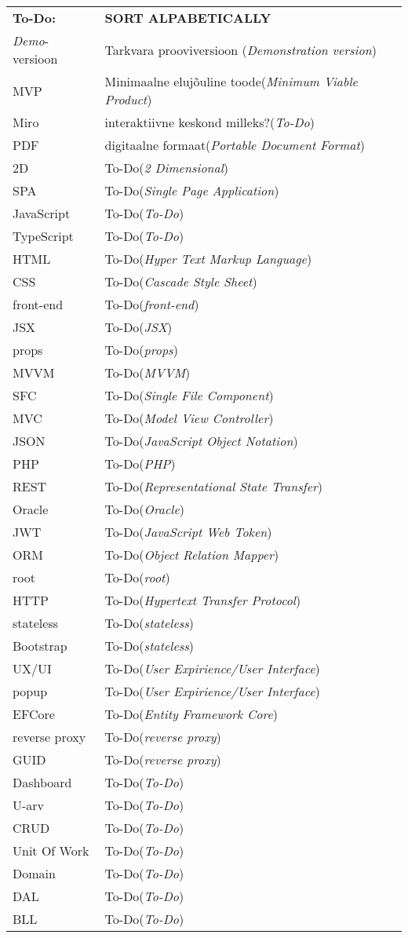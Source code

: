 \begin{longtable}{p{3cm}p{10cm}}
\textbf{To-Do:}&\textbf{SORT ALPABETICALLY}\\
\textit{Demo}-versioon&Tarkvara prooviversioon (\emph{Demonstration version})\\
MVP&Minimaalne elujõuline toode(\emph{Minimum Viable Product})\\
Miro&interaktiivne keskond milleks?(\emph{To-Do})\\
PDF&digitaalne formaat(\emph{Portable Document Format})\\
2D&To-Do(\emph{2 Dimensional})\\
SPA&To-Do(\emph{Single Page Application})\\
JavaScript&To-Do(\emph{To-Do})\\
TypeScript&To-Do(\emph{To-Do})\\
HTML&To-Do(\emph{Hyper Text Markup Language})\\
CSS&To-Do(\emph{Cascade Style Sheet})\\
front-end&To-Do(\emph{front-end})\\
JSX&To-Do(\emph{JSX})\\
props&To-Do(\emph{props})\\
MVVM&To-Do(\emph{MVVM})\\
SFC&To-Do(\emph{Single File Component})\\
MVC&To-Do(\emph{Model View Controller})\\
JSON&To-Do(\emph{JavaScript Object Notation})\\
PHP&To-Do(\emph{PHP})\\
REST&To-Do(\emph{Representational State Transfer})\\
Oracle&To-Do(\emph{Oracle})\\
JWT&To-Do(\emph{JavaScript Web Token})\\
ORM&To-Do(\emph{Object Relation Mapper})\\
root&To-Do(\emph{root})\\
HTTP&To-Do(\emph{Hypertext Transfer Protocol})\\
stateless&To-Do(\emph{stateless})\\
Bootstrap&To-Do(\emph{stateless})\\
UX/UI&To-Do(\emph{User Expirience/User Interface})\\
popup&To-Do(\emph{User Expirience/User Interface})\\
EFCore&To-Do(\emph{Entity Framework Core})\\
reverse proxy&To-Do(\emph{reverse proxy})\\
GUID&To-Do(\emph{reverse proxy})\\
Dashboard&To-Do(\emph{To-Do})\\
U-arv&To-Do(\emph{To-Do})\\
CRUD&To-Do(\emph{To-Do})\\
Unit Of Work&To-Do(\emph{To-Do})\\
Domain&To-Do(\emph{To-Do})\\
DAL&To-Do(\emph{To-Do})\\
BLL&To-Do(\emph{To-Do})\\

\end{longtable}
\addtocounter{table}{-1} 